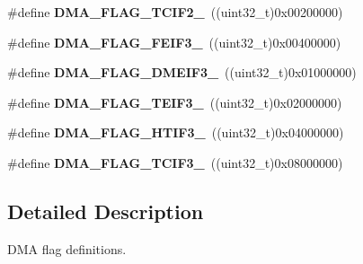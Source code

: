 \begin{DoxyCompactItemize}
\item 
\#define {\bfseries D\+M\+A\+\_\+\+F\+L\+A\+G\+\_\+\+T\+C\+I\+F2\+\_}~((uint32\+\_\+t)0x00200000)\hypertarget{group___d_m_a__flag__definitions_gab8096a50b81e30e474e2b1148b55a983}{}\label{group___d_m_a__flag__definitions_gab8096a50b81e30e474e2b1148b55a983}

\item 
\#define {\bfseries D\+M\+A\+\_\+\+F\+L\+A\+G\+\_\+\+F\+E\+I\+F3\+\_}~((uint32\+\_\+t)0x00400000)\hypertarget{group___d_m_a__flag__definitions_gaea8077c9d9c55c53024c9f90e7f2c76f}{}\label{group___d_m_a__flag__definitions_gaea8077c9d9c55c53024c9f90e7f2c76f}

\item 
\#define {\bfseries D\+M\+A\+\_\+\+F\+L\+A\+G\+\_\+\+D\+M\+E\+I\+F3\+\_}~((uint32\+\_\+t)0x01000000)\hypertarget{group___d_m_a__flag__definitions_ga3053e2fb5ef245cf9c847c4de3fd1732}{}\label{group___d_m_a__flag__definitions_ga3053e2fb5ef245cf9c847c4de3fd1732}

\item 
\#define {\bfseries D\+M\+A\+\_\+\+F\+L\+A\+G\+\_\+\+T\+E\+I\+F3\+\_}~((uint32\+\_\+t)0x02000000)\hypertarget{group___d_m_a__flag__definitions_ga7070307dcd59da45137962c521a06562}{}\label{group___d_m_a__flag__definitions_ga7070307dcd59da45137962c521a06562}

\item 
\#define {\bfseries D\+M\+A\+\_\+\+F\+L\+A\+G\+\_\+\+H\+T\+I\+F3\+\_}~((uint32\+\_\+t)0x04000000)\hypertarget{group___d_m_a__flag__definitions_ga139d44f447ab2cf5c18311cf6b6ee6e2}{}\label{group___d_m_a__flag__definitions_ga139d44f447ab2cf5c18311cf6b6ee6e2}

\item 
\#define {\bfseries D\+M\+A\+\_\+\+F\+L\+A\+G\+\_\+\+T\+C\+I\+F3\+\_}~((uint32\+\_\+t)0x08000000)\hypertarget{group___d_m_a__flag__definitions_ga4acf62e6807442dd5b611d95d1617b98}{}\label{group___d_m_a__flag__definitions_ga4acf62e6807442dd5b611d95d1617b98}

\end{DoxyCompactItemize}


\subsection{Detailed Description}
D\+MA flag definitions. 

